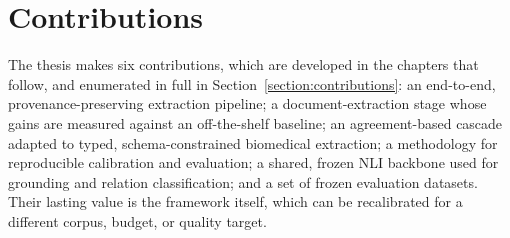 \section{Contributions}\label{section:intro-contributions}

The thesis makes six contributions, which are developed in the chapters that follow, and enumerated in full in Section~\ref{section:contributions}: an end-to-end, provenance-preserving extraction pipeline; a document-extraction stage whose gains are measured against an off-the-shelf baseline; an agreement-based cascade adapted to typed, schema-constrained biomedical extraction; a methodology for reproducible calibration and evaluation; a shared, frozen NLI backbone used for grounding and relation classification; and a set of frozen evaluation datasets. Their lasting value is the framework itself, which can be recalibrated for a different corpus, budget, or quality target.